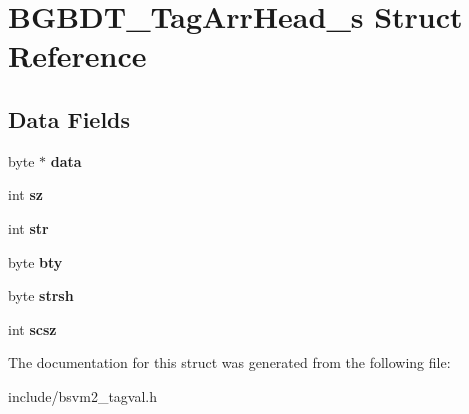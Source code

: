 \hypertarget{structBGBDT__TagArrHead__s}{\section{B\-G\-B\-D\-T\-\_\-\-Tag\-Arr\-Head\-\_\-s Struct Reference}
\label{structBGBDT__TagArrHead__s}
}
\subsection*{Data Fields}
\begin{DoxyCompactItemize}
\item 
\hypertarget{structBGBDT__TagArrHead__s_abf151c9697b01b15b0faa418d0d1d3d8}{byte $\ast$ {\bfseries data}}\label{structBGBDT__TagArrHead__s_abf151c9697b01b15b0faa418d0d1d3d8}

\item 
\hypertarget{structBGBDT__TagArrHead__s_aa0aa522f6a588bce38326bf1ad2a54a8}{int {\bfseries sz}}\label{structBGBDT__TagArrHead__s_aa0aa522f6a588bce38326bf1ad2a54a8}

\item 
\hypertarget{structBGBDT__TagArrHead__s_a1c789e5b8e79515e6be0221a72ce2b43}{int {\bfseries str}}\label{structBGBDT__TagArrHead__s_a1c789e5b8e79515e6be0221a72ce2b43}

\item 
\hypertarget{structBGBDT__TagArrHead__s_a5f14177a460583cbdcb61ec372100bcb}{byte {\bfseries bty}}\label{structBGBDT__TagArrHead__s_a5f14177a460583cbdcb61ec372100bcb}

\item 
\hypertarget{structBGBDT__TagArrHead__s_a93894c74dfaca833b2727d700c5036d7}{byte {\bfseries strsh}}\label{structBGBDT__TagArrHead__s_a93894c74dfaca833b2727d700c5036d7}

\item 
\hypertarget{structBGBDT__TagArrHead__s_a5488c1cfbdca7846b0a335d6d37c8a33}{int {\bfseries scsz}}\label{structBGBDT__TagArrHead__s_a5488c1cfbdca7846b0a335d6d37c8a33}

\end{DoxyCompactItemize}


The documentation for this struct was generated from the following file\-:\begin{DoxyCompactItemize}
\item 
include/bsvm2\-\_\-tagval.\-h\end{DoxyCompactItemize}
